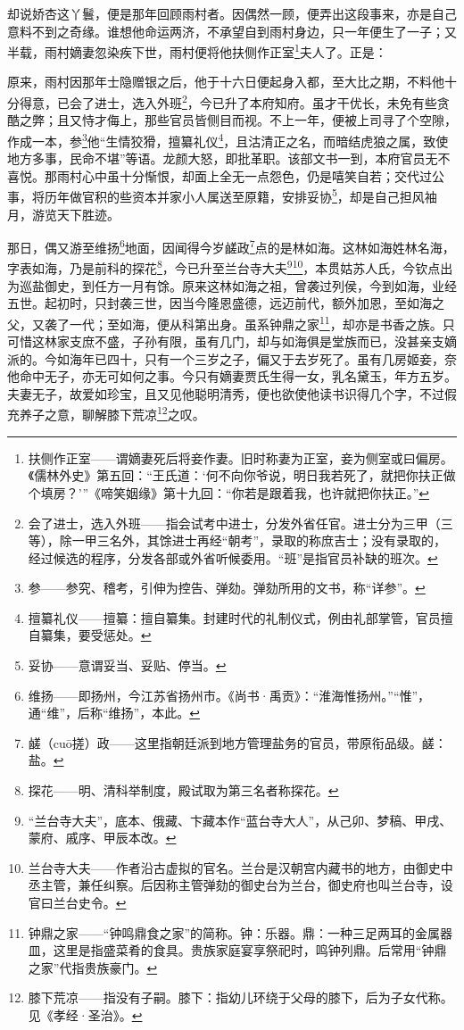 \par 却说娇杏这丫鬟，便是那年回顾雨村者。因偶然一顾，便弄出这段事来，亦是自己意料不到之奇缘。谁想他命运两济，不承望自到雨村身边，只一年便生了一子；又半载，雨村嫡妻忽染疾下世，雨村便将他扶侧作正室\footnote{扶侧作正室——谓嫡妻死后将妾作妻。旧时称妻为正室，妾为侧室或曰偏房。《儒林外史》第五回：“王氏道：‘何不向你爷说，明日我若死了，就把你扶正做个填房？’”《啼笑姻缘》第十九回：“你若是跟着我，也许就把你扶正。”}夫人了。正是：
\par 原来，雨村因那年士隐赠银之后，他于十六日便起身入都，至大比之期，不料他十分得意，已会了进士，选入外班\footnote{会了进士，选入外班——指会试考中进士，分发外省任官。进士分为三甲（三等），除一甲三名外，其馀进士再经“朝考”，录取的称庶吉士；没有录取的，经过候选的程序，分发各部或外省听候委用。“班”是指官员补缺的班次。}，今已升了本府知府。虽才干优长，未免有些贪酷之弊；且又恃才侮上，那些官员皆侧目而视。不上一年，便被上司寻了个空隙，作成一本，参\footnote{参——参究、稽考，引伸为控告、弹劾。弹劾所用的文书，称“详参”。}他“生情狡猾，擅纂礼仪\footnote{擅纂礼仪——擅纂：擅自纂集。封建时代的礼制仪式，例由礼部掌管，官员擅自纂集，要受惩处。}，且沽清正之名，而暗结虎狼之属，致使地方多事，民命不堪”等语。龙颜大怒，即批革职。该部文书一到，本府官员无不喜悦。那雨村心中虽十分惭恨，却面上全无一点怨色，仍是嘻笑自若；交代过公事，将历年做官积的些资本并家小人属送至原籍，安排妥协\footnote{妥协——意谓妥当、妥贴、停当。}，却是自己担风袖月，游览天下胜迹。
\par 那日，偶又游至维扬\footnote{维扬——即扬州，今江苏省扬州市。《尚书·禹贡》：“淮海惟扬州。”“惟”，通“维”，后称“维扬”，本此。}地面，因闻得今岁鹾政\footnote{鹾（cuō搓）政——这里指朝廷派到地方管理盐务的官员，带原衔品级。鹾：盐。}点的是林如海。这林如海姓林名海，字表如海，乃是前科的探花\footnote{探花——明、清科举制度，殿试取为第三名者称探花。}，今已升至兰台寺大夫\footnote{“兰台寺大夫”，底本、俄藏、卞藏本作“蓝台寺大人”，从己卯、梦稿、甲戌、蒙府、戚序、甲辰本改。}\footnote{兰台寺大夫——作者沿古虚拟的官名。兰台是汉朝宫内藏书的地方，由御史中丞主管，兼任纠察。后因称主管弹劾的御史台为兰台，御史府也叫兰台寺，设官曰兰台史令。}，本贯姑苏人氏，今钦点出为巡盐御史，到任方一月有馀。原来这林如海之祖，曾袭过列侯，今到如海，业经五世。起初时，只封袭三世，因当今隆恩盛德，远迈前代，额外加恩，至如海之父，又袭了一代；至如海，便从科第出身。虽系钟鼎之家\footnote{钟鼎之家——“钟鸣鼎食之家”的简称。钟：乐器。鼎：一种三足两耳的金属器皿，这里是指盛菜肴的食具。贵族家庭宴享祭祀时，鸣钟列鼎。后常用“钟鼎之家”代指贵族豪门。}，却亦是书香之族。只可惜这林家支庶不盛，子孙有限，虽有几门，却与如海俱是堂族而已，没甚亲支嫡派的。今如海年已四十，只有一个三岁之子，偏又于去岁死了。虽有几房姬妾，奈他命中无子，亦无可如何之事。今只有嫡妻贾氏生得一女，乳名黛玉，年方五岁。夫妻无子，故爱如珍宝，且又见他聪明清秀，便也欲使他读书识得几个字，不过假充养子之意，聊解膝下荒凉\footnote{膝下荒凉——指没有子嗣。膝下：指幼儿环绕于父母的膝下，后为子女代称。见《孝经·圣治》。}之叹。
